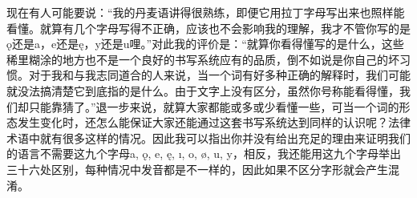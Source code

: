\begin{translation*}{}
  现在有人可能要说：“我的丹麦语讲得很熟练，即便它用拉丁字母写出来也照样能看懂。就算有几个字母写得不正确，应该也不会影响我的理解，我才不管你写的是ǫ还是a，e还是ę，y还是u哩。”对此我的评价是：“就算你看得懂写的是什么，这些稀里糊涂的地方也不是一个良好的书写系统应有的品质，倒不如说是你自己的坏习惯。对于我和与我志同道合的人来说，当一个词有好多种正确的解释时，我们可能就没法搞清楚它到底指的是什么。由于文字上没有区分，虽然你号称能看得懂，我们却只能靠猜了。”退一步来说，就算大家都能或多或少看懂一些，可当一个词的形态发生变化时，还怎么能保证大家还能通过这套书写系统达到同样的认识呢？法律术语中就有很多这样的情况。因此我可以指出你并没有给出充足的理由来证明我们的语言不需要这九个字母a, ǫ, e, ę, ı, o, ø, u, y，相反，我还能用这九个字母举出三十六处区别，每种情况中发音都是不一样的，因此如果不区分字形就会产生混淆。
\end{translation*}

